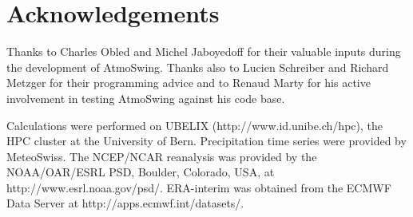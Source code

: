 \documentclass[review]{elsarticle}
\begin{document}
\section*{Acknowledgements}
Thanks to Charles Obled and Michel Jaboyedoff for their valuable inputs during the development of AtmoSwing. Thanks also to Lucien Schreiber and Richard Metzger for their programming advice and to Renaud Marty for his active involvement in testing AtmoSwing against his code base.  

Calculations were performed on UBELIX (http://www.id.unibe.ch/hpc), the HPC cluster at the University of Bern. Precipitation time series were provided by MeteoSwiss. The NCEP/NCAR reanalysis was provided by the NOAA/OAR/ESRL PSD, Boulder, Colorado, USA, at http://www.esrl.noaa.gov/psd/. ERA-interim was obtained from the ECMWF Data Server at http://apps.ecmwf.int/datasets/. 





\clearpage

	
\end{document}
